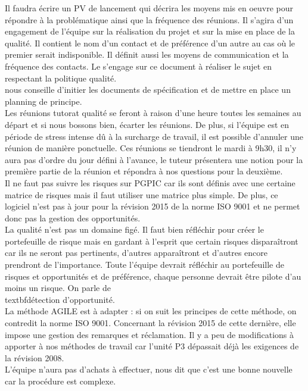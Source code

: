 \documentclass [a4paper] {article}
\begin{document}
Il faudra écrire un PV de lancement qui décrira les moyens mis en oeuvre pour répondre à la problématique ainsi que la fréquence des réunions. Il s'agira d'un engagement de l'équipe sur la réalisation du projet et sur la mise en place de la qualité.
Il contient le nom d'un contact et de préférence d'un autre au cas où le premier serait indisponible. Il définit aussi les moyens de communication et la fréquence des contacts.
Le \CP{} s'engage sur ce document à réaliser le sujet en respectant la politique qualité.
\\
\nomTuteurQualite{} nous conseille d'initier les documents de spécification et de mettre en place un planning de principe.
\\
Les réunions tutorat qualité se feront à raison d'une heure toutes les semaines au départ et si nous bossons bien, écarter les réunions. De plus, si l'équipe est en période de stress intense dû à la surcharge de travail, il est possible d'annuler une réunion de manière ponctuelle. Ces réunions se tiendront le mardi à 9h30, il n'y aura pas d'ordre du jour défini à l'avance, le tuteur présentera une notion pour la première partie de la réunion et répondra à nos questions pour la deuxième.
\\
Il ne faut pas suivre les risques sur PGPIC car ils sont définis avec une certaine matrice de risques mais il faut utiliser une matrice plus simple. De plus, ce logiciel n'est pas à jour pour la révision 2015 de la norme ISO 9001 et ne permet donc pas la gestion des opportunités.
\\
La qualité n'est pas un domaine figé. Il faut bien réfléchir pour créer le portefeuille de risque mais en gardant à l'esprit que certain risques disparaîtront car ils ne seront pas pertinents, d'autres apparaîtront et d'autres encore prendront de l'importance. Toute l'équipe devrait réfléchir au portefeuille de risques et opportunités et de préférence, chaque personne devrait être pilote d'au moins un risque. On parle de \\textbf{détection} d'opportunité.
\\
La méthode AGILE est à adapter : si on suit les principes de cette méthode, on contredit la norme ISO 9001. Concernant la révision 2015 de cette dernière, elle impose une gestion des remarques et réclamation. Il y a peu de modifications à apporter à nos méthodes de travail car l'unité P3 dépassait déjà les exigences de la révision 2008.
\\
L'équipe n'aura pas d'achats à effectuer, \nomTuteurQualite{} nous dit que c'est une bonne nouvelle car la procédure est complexe.
\end{document}
